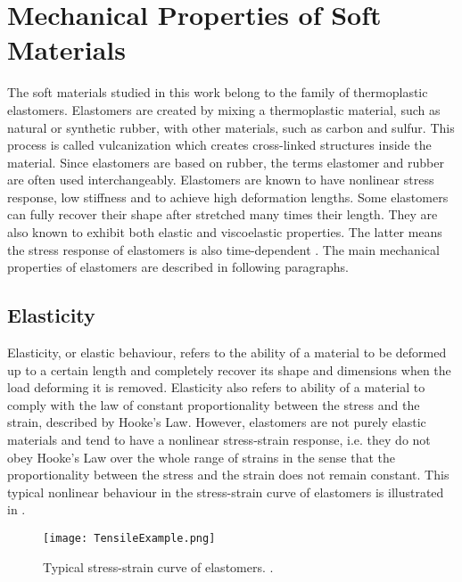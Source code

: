 \section{Mechanical Properties of Soft Materials} \label{sec:mechprop}

The soft materials studied in this work belong to the family of thermoplastic elastomers. Elastomers are created by mixing a thermoplastic material, such as natural or synthetic rubber, with other materials, such as carbon and sulfur. This process is called vulcanization which creates cross-linked structures inside the material. Since elastomers are based on rubber, the terms elastomer and rubber are often used interchangeably. Elastomers are known to have nonlinear stress response, low stiffness and to achieve high deformation lengths. Some elastomers can fully recover their shape after stretched many times their length. They are also known to exhibit both elastic and viscoelastic properties. The latter means the stress response of elastomers is also time-dependent \cite{Bauman2008}. The main mechanical properties of elastomers are described in following paragraphs.

\subsection{Elasticity}

Elasticity, or elastic behaviour, refers to the ability of a material to be deformed up to a certain length and completely recover its shape and dimensions when the load deforming it is removed. Elasticity also refers to ability of a material to comply with the law of constant proportionality between the stress and the strain, described by Hooke's Law. However, elastomers are not purely elastic materials and tend to have a nonlinear stress-strain response, i.e. they do not obey Hooke's Law over the whole range of strains in the sense that the proportionality between the stress and the strain does not remain constant. This typical nonlinear behaviour in the stress-strain curve of elastomers is illustrated in .

\begin{figure}[hbt!]
    \centering
    \texttt{[image: TensileExample.png]}
    \caption{Typical stress-strain curve of elastomers. \cite{Bauman2008}.}
    \label{fig:tensile}
\end{figure}

